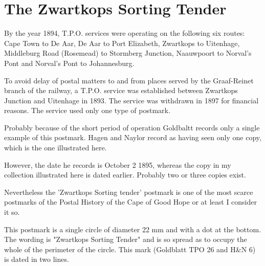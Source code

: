 \section{The Zwartkops Sorting Tender}



By the year 1894, T.P.O. services were operating on the following 
six routes: Cape Town to De Aar, De Aar to Port Elizabeth, 
Zwartkops to Uitenhage, Middleburg Road (Rosemead) to Stormberg Junction, 
Naauwpoort to Norval's Pont and Norval's Pont to Johannesburg.

To avoid delay of postal matters to and from places served by the Graaf-Reinet branch of the railway, a T.P.O. service was established between Zwartkops Junction and Uitenhage in 1893. The service was withdrawn in 1897 for financial reasons. The service used only one type of postmark.

Probably because of the short period of operation Goldbaltt records only a single example of this postmark. Hagen and Naylor record as having seen only one copy, which is the one illustrated here.

However, the date he records is October 2 1895, whereas the copy in my collection illustrated here is dated earlier. Probably two or three copies exist. 


Nevertheless the 'Zwartkops Sorting tender' postmark is one of 
the most scarce postmarks of the Postal History of the 
Cape of Good Hope or at least I consider it so.

This postmark is a single circle of diameter 22 mm and 
with a dot at the bottom. The wording is "Zwartkops Sorting Tender" 
and is so spread as to occupy the whole of the perimeter of the circle. 
This mark (Goldblatt TPO 26 and H\&N 6) is dated in two lines.      